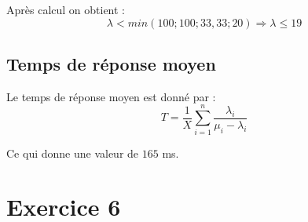 \documentclass[a4paper, 11pt, fleqn]{article}
\newcommand{\inve}[1]{\frac{1}{#1}}
\begin{document}
Après calcul on obtient : $$
\lambda < min (100; 100; 33,33; 20) \Longrightarrow \lambda \leq 19 $$

\subsection{Temps de réponse moyen}

Le temps de réponse moyen est donné par : $$
T = \inve{X} \sum_{i=1}^{n} \frac{\lambda_i}{\mu_i - \lambda_i} $$

Ce qui donne une valeur de $165$ ms.

\section{Exercice 6}
\end{document}
